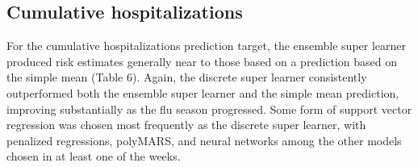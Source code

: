 \documentclass[10pt,letterpaper]{article}
\begin{document}
\hypertarget{cumulative-hospitalizations}{%
\subsection{Cumulative
hospitalizations}\label{cumulative-hospitalizations}}

For the cumulative hospitalizations prediction target, the ensemble
super learner produced risk estimates generally near to those based on a
prediction based on the simple mean (Table 6). Again, the discrete super
learner consistently outperformed both the ensemble super learner and
the simple mean prediction, improving substantially as the flu season
progressed. Some form of support vector regression was chosen most
frequently as the discrete super learner, with penalized regressions,
polyMARS, and neural networks among the other models chosen in at least
one of the weeks.
\end{document}
